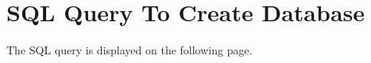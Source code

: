 



\cleardoublepage

\frontmatter

\cleardoublepage







\newpage
\mainmatter
\tableofcontents*
\newpage


\listoffixmes



















\appendix
\chapter{SQL Query To Create Database}
The SQL query is displayed on the following page.




\label{LastPage}
